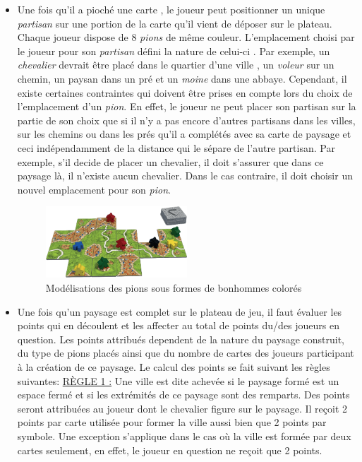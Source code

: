 \documentclass[12pt]{article}
\begin{document}
\begin{itemize}
\item Une fois qu'il a pioché une carte , le joueur peut positionner un unique \textit{partisan} sur une portion de la carte qu'il vient de déposer sur le plateau. Chaque joueur dispose de 8 \textit{pions} de même couleur. L'emplacement choisi par le joueur pour son \textit{partisan} défini la nature de celui-ci . Par exemple, un \textit{chevalier} devrait être placé dans le quartier d'une ville , un \textit{voleur} sur un chemin, un paysan dans un pré et un \textit{moine} dans une abbaye. Cependant, il existe certaines contraintes qui doivent être prises en compte lors du choix de l'emplacement d'un \textit{pion}. 				
En effet, le joueur ne peut placer son partisan sur la partie de son choix que si il n'y a pas encore d'autres partisans dans les villes, sur les chemins ou dans les prés qu'il a complétés avec sa carte de paysage et ceci indépendamment de la distance qui le sépare de l'autre partisan. Par exemple, s'il decide de placer un chevalier, il doit s'assurer que dans ce paysage là, il n'existe aucun chevalier. Dans le cas contraire, il doit choisir un nouvel emplacement pour son \textit{pion}.\newline

\begin{figure}
\begin{center}
\includegraphics[width=0.5\textwidth]{meepleonmap.png}
\end{center}
\caption{Modélisations des pions sous formes de bonhommes colorés} \label{figure2}
\end{figure}

\item Une fois qu'un paysage est complet sur le plateau de jeu, il faut évaluer les points qui en découlent et les affecter au total de points du/des joueurs en question. Les points attribués dependent de la nature du paysage construit, du type de pions placés ainsi que du nombre de cartes des joueurs participant à la création de ce paysage.\newline
Le calcul des points se fait suivant les règles suivantes:\newline
\underline{RÈGLE 1 :} Une ville est dite achevée si le paysage formé est un espace fermé et si les extrémités de ce paysage sont des remparts. Des points seront attribuées au joueur dont le chevalier figure sur le paysage. Il reçoit 2 points par carte utilisée pour former la ville aussi bien que 2 points par symbole. Une exception s'applique dans le cas où la ville est formée par deux cartes seulement, en effet, le joueur en question ne reçoit que 2 points.\newline


\end{itemize}
\end{document}
